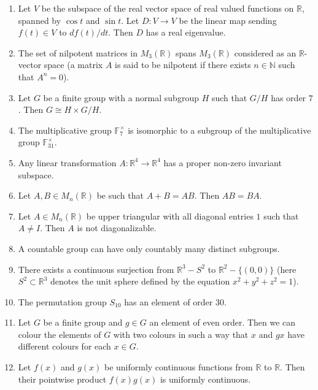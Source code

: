 \documentclass[11pt, a4paper]{article}
\begin{document}
\begin{enumerate}
  \item Let $V$ be the subspace of the real vector space of real valued functions on $\mathbb{R}$, spanned by $\cos t$ and $\sin t$. Let $D: V \to V$ be the linear map sending $f(t) \in V$ to $df(t)/dt$. Then $D$ has a real eigenvalue.
  \item The set of nilpotent matrices in $M_3(\mathbb{R})$ spans $M_3(\mathbb{R})$ considered as an $\mathbb{R}$-vector space (a matrix $A$ is said to be nilpotent if there exists $n \in \mathbb{N}$ such that $A^n = 0$).
  \item Let $G$ be a finite group with a normal subgroup $H$ such that $G/H$ has order $7$. Then $G \cong H \times G/H$.
  \item The multiplicative group $\mathbb{F}_7^\times$ is isomorphic to a subgroup of the multiplicative group $\mathbb{F}_{31}^\times$.
  \item Any linear transformation $A: \mathbb{R}^4 \to \mathbb{R}^4$ has a proper non-zero invariant subspace.
  \item Let $A, B \in M_n(\mathbb{R})$ be such that $A + B = AB$. Then $AB = BA$.
  \item Let $A \in M_n(\mathbb{R})$ be upper triangular with all diagonal entries $1$ such that $A \ne I$. Then $A$ is not diagonalizable.
  \item A countable group can have only countably many distinct subgroups.
  \item There exists a continuous surjection from $\mathbb{R}^3 - S^2$ to $\mathbb{R}^2 - \{(0,0)\}$ (here $S^2 \subset \mathbb{R}^3$ denotes the unit sphere defined by the equation $x^2 + y^2 + z^2 = 1$).
  \item The permutation group $S_{10}$ has an element of order $30$.
  \item Let $G$ be a finite group and $g \in G$ an element of even order. Then we can colour the elements of $G$ with two colours in such a way that $x$ and $gx$ have different colours for each $x \in G$.
  \item Let $f(x)$ and $g(x)$ be uniformly continuous functions from $\mathbb{R}$ to $\mathbb{R}$. Then their pointwise product $f(x)g(x)$ is uniformly continuous.
\end{enumerate}
\end{document}
